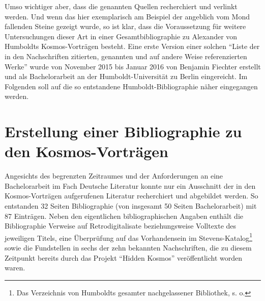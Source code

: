 \documentclass[output=paper]{langsci/langscibook}
\begin{document}
Umso wichtiger aber, dass die genannten Quellen recherchiert und
verlinkt werden. Und wenn das hier exemplarisch am Beispiel der
angeblich vom Mond fallenden Steine gezeigt wurde, so ist klar, dass die
Voraussetzung für weitere Untersuchungen dieser Art in einer
Gesamtbibliographie zu Alexander von Humboldts Kosmos-Vorträgen besteht.
Eine erste Version einer solchen \enquote{Liste der in den Nachschriften
zitierten, genannten und auf andere Weise referenzierten Werke} wurde
von November 2015 bis Januar 2016 von Benjamin Fiechter erstellt und als
Bachelorarbeit an der Humboldt-Universität zu Berlin eingereicht. Im
Folgenden soll auf die so entstandene Humboldt-Bibliographie näher
eingegangen werden.

\section*{Erstellung einer Bibliographie zu den
Kosmos-Vorträgen}\label{erstellung-einer-bibliographie-zu-den-kosmos-vortruxe4gen}

Angesichts des begrenzten Zeitraumes und der Anforderungen an eine
Bachelorarbeit im Fach Deutsche Literatur konnte nur ein Ausschnitt der
in den Kosmos-Vorträgen aufgerufenen Literatur recherchiert und
abgebildet werden. So entstanden 32 Seiten Bibliographie (von insgesamt
50 Seiten Bachelorarbeit) mit 87 Einträgen. Neben den eigentlichen
bibliographischen Angaben enthält die Bibliographie Verweise auf
Retrodigitalisate beziehungsweise Volltexte des jeweiligen Titels, eine
Überprüfung auf das Vorhandensein im Stevens-Katalog\footnote{Das
  Verzeichnis von Humboldts gesamter nachgelassener Bibliothek, s. o.}
sowie die Fundstellen in sechs der zehn bekannten Nachschriften, die zu
diesem Zeitpunkt bereits durch das Projekt \enquote{Hidden Kosmos}
veröffentlicht worden waren.
\end{document}
